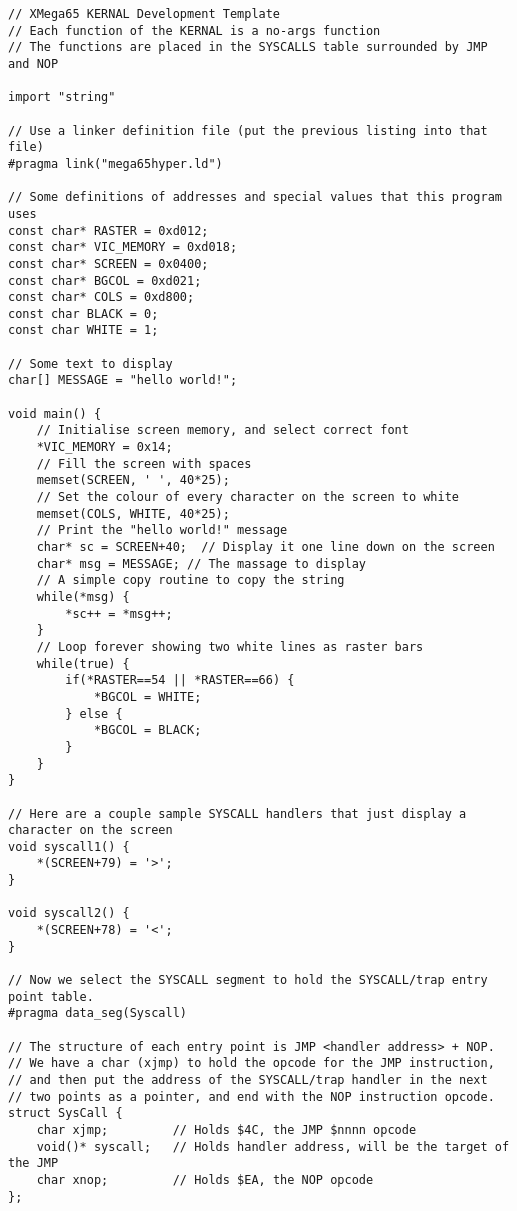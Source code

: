\begin{tcolorbox}[colback=black,coltext=white]
\verbatimfont{\codefont}
\begin{verbatim}
// XMega65 KERNAL Development Template
// Each function of the KERNAL is a no-args function
// The functions are placed in the SYSCALLS table surrounded by JMP and NOP

import "string"

// Use a linker definition file (put the previous listing into that file)
#pragma link("mega65hyper.ld")

// Some definitions of addresses and special values that this program uses
const char* RASTER = 0xd012;
const char* VIC_MEMORY = 0xd018;
const char* SCREEN = 0x0400;
const char* BGCOL = 0xd021;
const char* COLS = 0xd800;
const char BLACK = 0;
const char WHITE = 1;

// Some text to display
char[] MESSAGE = "hello world!";

void main() {
    // Initialise screen memory, and select correct font
    *VIC_MEMORY = 0x14;
    // Fill the screen with spaces
    memset(SCREEN, ' ', 40*25);
    // Set the colour of every character on the screen to white
    memset(COLS, WHITE, 40*25);
    // Print the "hello world!" message
    char* sc = SCREEN+40;  // Display it one line down on the screen
    char* msg = MESSAGE; // The massage to display
    // A simple copy routine to copy the string
    while(*msg) {
        *sc++ = *msg++;
    }
    // Loop forever showing two white lines as raster bars
    while(true) {
        if(*RASTER==54 || *RASTER==66) {
            *BGCOL = WHITE;
        } else {
            *BGCOL = BLACK;
        }
    }
}

// Here are a couple sample SYSCALL handlers that just display a character on the screen
void syscall1() {
    *(SCREEN+79) = '>';
}

void syscall2() {
    *(SCREEN+78) = '<';
}

// Now we select the SYSCALL segment to hold the SYSCALL/trap entry point table.
#pragma data_seg(Syscall)

// The structure of each entry point is JMP <handler address> + NOP.
// We have a char (xjmp) to hold the opcode for the JMP instruction,
// and then put the address of the SYSCALL/trap handler in the next
// two points as a pointer, and end with the NOP instruction opcode.
struct SysCall {
    char xjmp;         // Holds $4C, the JMP $nnnn opcode
    void()* syscall;   // Holds handler address, will be the target of the JMP
    char xnop;         // Holds $EA, the NOP opcode
};


\end{verbatim}
\end{tcolorbox}
